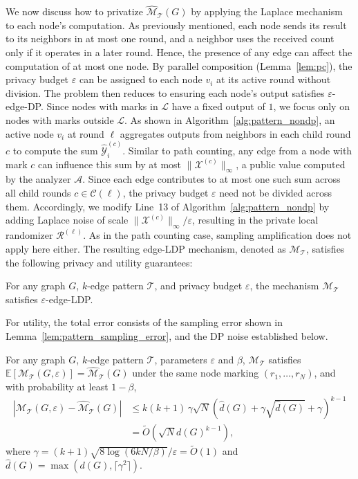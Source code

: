 We now discuss how to privatize $\widehat{\mathcal{M}}_\mathcal{T}(G)$ by applying the Laplace mechanism to each node's computation.
As previously mentioned, each node sends its result to its neighbors in at most one round, and a neighbor uses the received count only if it operates in a later round. 
Hence, the presence of any edge can affect the computation of at most one node. 
By parallel composition (Lemma~\ref{lem:pc}), the privacy budget $\varepsilon$ can be assigned to each node $v_i$ at its active round without division.
The problem then reduces to ensuring each node's output satisfies $\varepsilon$-edge-DP. 
Since nodes with marks in $\mathcal{L}$ have a fixed output of $1$, we focus only on nodes with marks outside $\mathcal{L}$.
As shown in Algorithm~\ref{alg:pattern_nondp}, an active node $v_i$ at round $\ell$ aggregates outputs from neighbors in each child round $c$ to compute the sum $\widehat{\mathcal{Y}}^{(c)}_i$. 
Similar to path counting, any edge from a node with mark $c$ can influence this sum by at most $\| \mathcal{X}^{(c)} \|_\infty$, a public value computed by the analyzer $\mathcal{A}$.
Since each edge contributes to at most one such sum across all child rounds $c \in \mathcal{C}(\ell)$, the privacy budget $\varepsilon$ need not be divided across them. 
Accordingly, we modify Line~13 of Algorithm~\ref{alg:pattern_nondp} by adding Laplace noise of scale $\| \mathcal{X}^{(c)} \|_\infty / \varepsilon$, resulting in the private local randomizer $\mathcal{R}^{(\ell)}$. 
{As in the path counting case, sampling amplification does not apply here either.}
The resulting edge-LDP mechanism, denoted as $\mathcal{M}_\mathcal{T}$, satisfies the following privacy and utility guarantees:

\begin{theorem}
\label{the:pattern_privacy}
For any graph $G$, $k$-edge pattern $\mathcal{T}$, and privacy budget $\varepsilon$, 
the mechanism $\mathcal{M}_\mathcal{T}$ satisfies $\varepsilon$-edge-LDP.
\end{theorem}
For utility, the total error consists of the sampling error shown in Lemma~\ref{lem:pattern_sampling_error}, and the {DP noise} established below.


\begin{lemma}
    \label{lem:pattern_additive_bound}
    For any graph $G$, $k$-edge pattern $\mathcal{T}$, parameters $\varepsilon$ and $\beta$, 
$\mathcal{M}_{\mathcal{T}}$ satisfies
$
    \mathbb{E}[\mathcal{M}_{\mathcal{T}}(G, \varepsilon)] = 
    \widehat{\mathcal{M}}_{\mathcal{T}}(G)
$ 
under the same node marking $(r_1, \dots, r_N)$, 
and with probability at least $1 - \beta$,
\begin{align*}
    |\mathcal{M}_{\mathcal{T}}(G, \varepsilon) - 
    \widehat{\mathcal{M}}_{\mathcal{T}}(G)| 
    &\leq 
    {k(k+1)} \,
    \gamma
    \sqrt{N}
    (\hat{d}(G) + \gamma \sqrt{\hat{d}(G)} + \gamma)^{k-1} 
    \\
    &=  \tilde{O}(\sqrt{N} d(G)^{k-1}),
\end{align*}
where $\gamma = (k+1)\sqrt{8\log(6kN/\beta)}/\varepsilon = \tilde{O}(1)$ and $\hat{d}(G) = \max(d(G), \lceil \gamma^2 \rceil)$.
\end{lemma}


